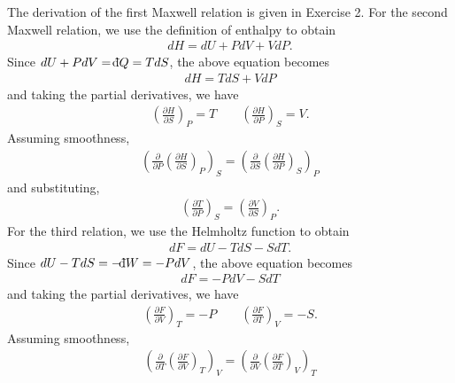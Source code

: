 \documentclass[a4paper,12pt]{article}
\def\dbar{{\mathchar'26\mkern-12mu \mathrm{d}}}
\begin{document}
\begin{enumerate}[label=\textbf{[\arabic*]}]
        \item
            The derivation of the first Maxwell relation is given in Exercise 2. For the second Maxwell relation, we use the definition of enthalpy to obtain
            \begin{align*}
                dH = dU + PdV + VdP.
            \end{align*}
            Since $dU + PdV = \dbar Q = TdS$, the above equation becomes
            \begin{align*}
                dH = TdS + VdP
            \end{align*}
            and taking the partial derivatives, we have
            \begin{align*}
                \left( \frac{\partial H}{\partial S} \right)_P = T \qquad \left( \frac{\partial H}{\partial P} \right)_S = V.
            \end{align*}
            Assuming smoothness,
            \begin{align*}
                \left( \frac{\partial}{\partial P} \left( \frac{\partial H}{\partial S} \right)_P \right)_S = \left( \frac{\partial}{\partial S} \left( \frac{\partial H}{\partial P} \right)_S \right)_P
            \end{align*}
            and substituting,
            \begin{align*}
                \left( \frac{\partial T}{\partial P} \right)_S = \left( \frac{\partial V}{\partial S} \right)_P.
            \end{align*}
            For the third relation, we use the Helmholtz function to obtain
            \begin{align*}
                dF = dU - TdS - SdT.
            \end{align*}
            Since $dU - TdS = -\dbar W = -PdV$, the above equation becomes
            \begin{align*}
                dF = -PdV - SdT
            \end{align*}
            and taking the partial derivatives, we have
            \begin{align*}
                \left( \frac{\partial F}{\partial V} \right)_T = -P \qquad \left( \frac{\partial F}{\partial T} \right)_V = -S.
            \end{align*}
            Assuming smoothness,
            \begin{align*}
                \left( \frac{\partial}{\partial T} \left( \frac{\partial F}{\partial V} \right)_T \right)_V = \left( \frac{\partial}{\partial V} \left( \frac{\partial F}{\partial T} \right)_V \right)_T

\end{align*}
\end{enumerate}
\end{document}
